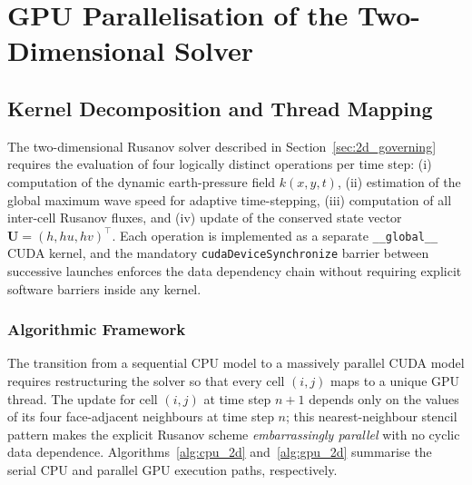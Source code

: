 \documentclass[10pt, conference]{FMFP2023}
\begin{document}
%

\section{GPU Parallelisation of the Two-Dimensional Solver}
\label{sec:gpu2d}

\subsection{Kernel Decomposition and Thread Mapping}

The two-dimensional Rusanov solver described in
Section~\ref{sec:2d_governing} requires the evaluation of
four logically distinct operations per time step:
(i) computation of the dynamic earth-pressure field
$k(x,y,t)$,
(ii) estimation of the global maximum wave speed for
adaptive time-stepping,
(iii) computation of all inter-cell Rusanov fluxes, and
(iv) update of the conserved state vector
$\bm{U}=(h,hu,hv)^\top$.
Each operation is implemented as a separate
\texttt{\_\_global\_\_} CUDA kernel, and the mandatory
\texttt{cudaDeviceSynchronize} barrier between successive
launches enforces the data dependency chain without
requiring explicit software barriers inside any kernel.

\subsubsection{Algorithmic Framework}

The transition from a sequential CPU model to a massively
parallel CUDA model requires restructuring the solver so
that every cell $(i,j)$ maps to a unique GPU thread.
The update for cell $(i,j)$ at time step $n+1$ depends only
on the values of its four face-adjacent neighbours at time
step $n$; this nearest-neighbour stencil pattern makes the
explicit Rusanov scheme \emph{embarrassingly parallel} with
no cyclic data dependence.
Algorithms~\ref{alg:cpu_2d} and~\ref{alg:gpu_2d} summarise
the serial CPU and parallel GPU execution paths,
respectively.
\end{document}
